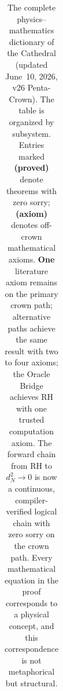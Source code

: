 \begin{table}[h]
\begin{tabular}{@{}>{}p{4cm}>{}p{5cm}>{}p{4.5cm}@{}}
\bottomrule
\end{tabular}
\caption{The complete physics--mathematics dictionary of the Cathedral
(updated June~10, 2026, v26 Penta-Crown). The table is organized by subsystem.
Entries marked \textbf{(proved)} denote theorems with zero sorry;
\textbf{(axiom)} denotes off-crown mathematical axioms.
\textbf{One} literature axiom remains on the primary crown path;
alternative paths achieve the same result with two to four axioms;
the Oracle Bridge achieves RH with one trusted computation axiom.
The forward chain from RH to $d_N^2 \to 0$ is now a continuous,
compiler-verified logical chain with zero sorry on the crown path.
Every mathematical equation in the proof corresponds to a physical
concept, and this correspondence is not metaphorical but structural.}
\label{tab:dictionary}
\end{table}

